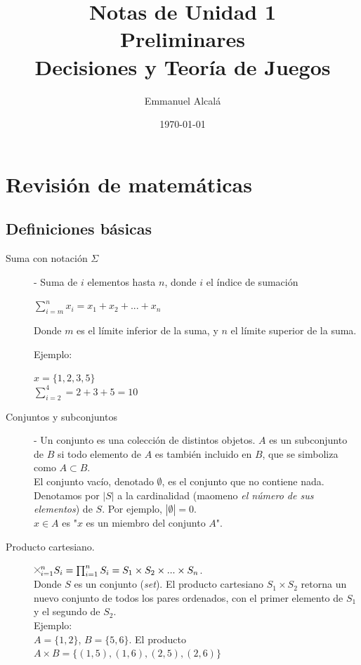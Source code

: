 \documentclass[12pt]{scrartcl}
\title{Notas de Unidad 1\\ \textbf{Preliminares}\\ \normalsize Decisiones y Teoría de Juegos}
\author{Emmanuel Alcalá}
\date{\today}
\theoremstyle{definition}
\newcommand{\Cross}{\mathbin{\tikz [x=1.4ex,y=1.4ex,line width=.1ex] \draw (0,0) -- (1,1) (0,1) -- (1,0);}}%
\begin{document}
\setlength{\parskip}{5mm}
\maketitle

\section{Revisión de matemáticas}
\subsection{Definiciones básicas}

\begin{description}

\item[Suma con notación $\Sigma$] - Suma de $i$ elementos hasta $n$, donde $i$ el índice de sumación

\begin{center}
    $\sum_{i=m}^n x_i=x_1 + x_2 + ... + x_n$
\end{center}

Donde $m$ es el límite inferior de la suma, y $n$ el límite superior de la suma. 

Ejemplo:

\begin{center}
    $x=\{1, 2, 3, 5 \}$ \\
    $\sum_{i=2}^{4} = 2 + 3 + 5 = 10$
\end{center}

\item[Conjuntos y subconjuntos] - Un conjunto es una colección de distintos objetos. $A$ es un subconjunto de $B$ si todo elemento de $A$ es también incluido en $B$, que se simboliza como $A \subset B$. \\
El conjunto vacío, denotado $\emptyset$, es el conjunto que no contiene nada.\\
Denotamos por $|S|$ a la cardinalidad (maomeno \textit{el número de sus elementos}) de $S$. Por ejemplo, $|\emptyset|=0$. \\
$x \in A$ es "$x$ es un miembro del conjunto $A$".

\item[Producto cartesiano.] $\Cross_{i=1}^n S_i = \prod_{i=1}^n S_i = S_1 \times S_2 \times ... \times S_n$.\\
Donde $S$ es un conjunto (\textit{set}). El producto cartesiano $S_1 \times S_2$ retorna un nuevo conjunto de todos los pares ordenados, con el primer elemento de $S_1$ y el segundo de $S_2$.\\
Ejemplo:\\
$A = \{1, 2\}$, $B = \{5, 6\}$. El producto $A\times B = \{(1, 5), (1, 6), (2, 5), (2, 6) \}$


\end{description}
\end{document}
